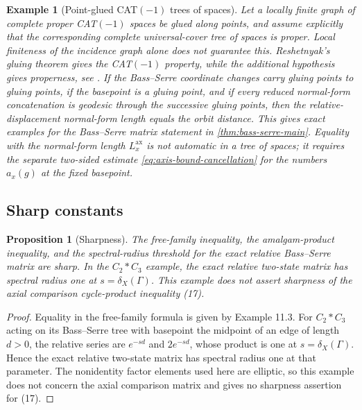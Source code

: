 \documentclass[11pt]{article}
\newtheorem{proposition}[proposition]{Proposition}
\newtheorem{example}[example]{Example}
\theoremstyle{definition}
\newcommand{\ax}{\mathrm{ax}}
\begin{document}
\begin{example}[Point-glued CAT$(-1)$ trees of spaces]
Let a locally finite graph of complete proper CAT$(-1)$ spaces be glued along points, and
assume explicitly that the corresponding complete universal-cover tree of spaces is proper.
Local finiteness of the incidence graph alone does not guarantee this.  Reshetnyak's gluing
theorem gives the CAT$(-1)$ property, while the additional hypothesis gives properness, see
\cite[Chapter~II.11]{BridsonHaefliger1999}.  If the Bass--Serre coordinate changes carry
gluing points to gluing points, if the basepoint is a gluing point, and if every reduced
normal-form concatenation is geodesic through the successive gluing points, then the
relative-displacement normal-form length equals the orbit distance.  This gives exact examples for the Bass--Serre matrix statement in \cref{thm:bass-serre-main}.  Equality with the normal-form length $L_x^{\ax}$ is not automatic in a tree of spaces; it requires the separate two-sided estimate \eqref{eq:axis-bound-cancellation} for the numbers $a_x(g)$ at the fixed basepoint.
\end{example}

\subsection{Sharp constants}

\begin{proposition}[Sharpness]
\label{prop:sharpness}
The free-family inequality, the amalgam-product inequality, and the spectral-radius threshold for the exact relative Bass--Serre matrix are sharp. In the $C_2\ast C_3$ example, the exact relative two-state matrix has spectral radius one at $s=\delta_X(\Gamma)$. This example does not assert sharpness of the axial comparison cycle-product inequality (17).
\end{proposition}

\begin{proof}
Equality in the free-family formula is given by Example 11.3. For $C_2\ast C_3$ acting on its Bass--Serre tree with basepoint the midpoint of an edge of length $d>0$, the relative series are $e^{-sd}$ and $2e^{-sd}$, whose product is one at $s=\delta_X(\Gamma)$. Hence the exact relative two-state matrix has spectral radius one at that parameter. The nonidentity factor elements used here are elliptic, so this example does not concern the axial comparison matrix and gives no sharpness assertion for (17).
\end{proof}
\end{document}
